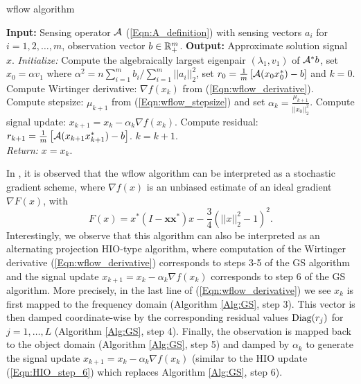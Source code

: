\begin{algorithm}[H]
\caption{wflow algorithm}	\label{Alg:wflow}

\begin{algorithmic}[1]
	\Statex 	\textbf{Input:} Sensing operator ${\mathcal A}$ (\ref{Eqn:A_definition}) with sensing vectors $a_i$ for $i =1, 2, \ldots, m$, observation vector $b \in {\mathbb R}^m_+$.
	\Statex 	\textbf{Output:} Approximate solution signal $x$.
	\State 		\textit{Initialize:} Compute the algebraically largest eigenpair $(\lambda_1, v_1)$ of ${\mathcal A}^*b$, set $x_0 = \alpha v_1$ where $\alpha^2 =  n \sum_{i=1}^mb_i / \sum_{i=1}^m ||a_i||_2^2$, set $r_0 = \frac{1}{m} \left[ {\mathcal A}(x_{0}x_{0}^*) - b \right]$ and  $k = 0$.
		\State	Compute Wirtinger derivative: $\nabla f(x_k)$ from (\ref{Eqn:wflow_derivative}).
		\State	Compute stepsize: $\mu_{k+1}$ from (\ref{Eqn:wflow_stepsize}) and set $\alpha_k = \frac{\mu_{k+1}}{||x_0||_2^2}$.
		\State 	Compute signal update: $x_{k+1} = x_k - \alpha_k \nabla f(x_k)$.
		\State	Compute residual: $r_{k+1} = \frac{1}{m} \left[ {\mathcal A}(x_{k+1}x_{k+1}^*) - b \right]$.
		\State	$k = k + 1$.
	\EndWhile	\\
	\textit{Return:} $x =  x_k$.
\end{algorithmic}
\end{algorithm}


In \cite[Section 2.3]{DBLP:journals/tit/CandesLS15}, it is observed that the wflow algorithm can be interpreted as a stochastic gradient scheme, where $\nabla f(x)$ is an unbiased estimate of an ideal gradient $\nabla F(x)$, with
\begin{equation}
F(x) = x^* \left( I - \mathbf{x}\mathbf{x}^* \right) x - \frac{3}{4} \left( ||x||_2^2 - 1\right)^2.
\end{equation}
Interestingly, we observe that this algorithm can also be interpreted as an alternating projection HIO-type algorithm, where computation of the Wirtinger derivative (\ref{Eqn:wflow_derivative}) corresponds to steps 3-5 of the GS algorithm and the signal update $x_{k+1} = x_k - \alpha_k \nabla f(x_k)$ corresponds to step 6 of the GS algorithm.  
More precisely, in the last line of (\ref{Eqn:wflow_derivative}) we see $x_k$ is first mapped to the frequency domain (Algorithm \ref{Alg:GS}, step 3).  
This vector is then damped coordinate-wise by the corresponding residual values $\textnormal{Diag}(r_j)$ for $j = 1, \ldots, L$  (Algorithm \ref{Alg:GS}, step 4).  
Finally, the observation is mapped back to the object domain (Algorithm \ref{Alg:GS}, step 5) and damped by $\alpha_k$ to generate the signal update $x_{k+1} = x_k - \alpha_k \nabla f(x_k)$ (similar to the HIO update (\ref{Eqn:HIO_step_6}) which replaces Algorithm \ref{Alg:GS}, step 6).  

